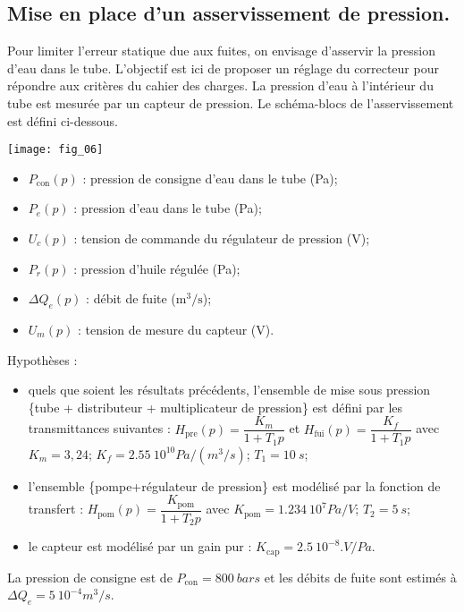 \begin{multicols}{2}
\subsection*{Mise en place d'un asservissement de pression.}
\ifprof
\else
Pour limiter l’erreur statique due aux fuites, on envisage d’asservir la pression d’eau dans le tube. L’objectif est ici de proposer un réglage du correcteur pour répondre aux critères du cahier des charges.
La pression d’eau à l’intérieur du tube est mesurée par un capteur de pression. Le schéma-blocs de l’asservissement est défini ci-dessous.

\begin{center}
\texttt{[image: fig\_06]}
\end{center}

\begin{itemize}
\item $P_{\text{con}}(p)$ 	: 	pression de consigne d’eau dans le tube (Pa);
\item $P_e(p)$ 	:	pression d’eau dans le tube (Pa);
\item $U_c(p)$ 	: 	tension de commande du régulateur de pression (V);
\item $P_r(p)$ 	:	pression d’huile régulée (Pa);
\item $\Delta Q_e(p)$ 	:	débit de fuite ($\text{m}^3/\text{s}$);
\item $U_m(p)$ 	:	tension de mesure du capteur (V).
\end{itemize}

Hypothèses : 
\begin{itemize}
\item quels que soient les résultats précédents, l’ensemble de mise sous pression \{tube + distributeur + multiplicateur de pression\} est défini par les transmittances suivantes :
$H_{\text{pre}} (p)=\dfrac{K_m}{1+T_1 p}$ et $H_{\text{fui}} (p)=\dfrac{K_f}{1+T_1 p}$
avec $K_m = 3,24$; $K_f = \SI{2,55}{10^{10} Pa/(m^3/s)}$; $T_1  =\SI{10}{s}$; 
\item l’ensemble \{pompe+régulateur de pression\} est modélisé par la fonction de transfert :
$H_{\text{pom}} (p)=\dfrac{K_{\text{pom}}}{1+T_2 p}$ avec $K_{\text{pom}} = \SI{1,234}{10^7 Pa/V}$; 	$T_2 = \SI{5}{s}$;
\item le capteur est modélisé par un gain pur :	$K_{\text{cap}}= \SI{2,5}{10^{-8}.V/Pa}$.
\end{itemize}

La pression de consigne est de $P_{\text{con}} = \SI{800}{bars}$ et les débits de fuite sont estimés à $\Delta Q_e = \SI{5}{10^{-4} m^3/s}$.


\end{multicols}
